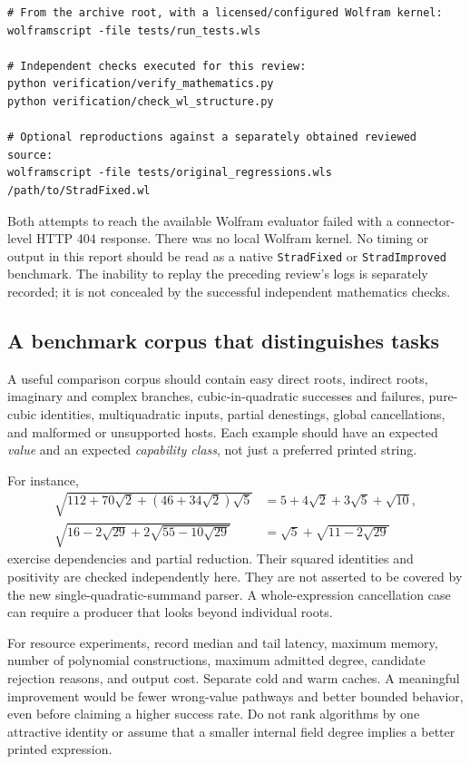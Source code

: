 \documentclass[11pt,letterpaper]{article}
\newcommand{\code}[1]{\texttt{#1}}
\theoremstyle{definition}
\begin{document}
\begin{lstlisting}
# From the archive root, with a licensed/configured Wolfram kernel:
wolframscript -file tests/run_tests.wls

# Independent checks executed for this review:
python verification/verify_mathematics.py
python verification/check_wl_structure.py

# Optional reproductions against a separately obtained reviewed source:
wolframscript -file tests/original_regressions.wls /path/to/StradFixed.wl
\end{lstlisting}

Both attempts to reach the available Wolfram evaluator failed with a connector-level HTTP 404 response. There was no local Wolfram kernel. No timing or output in this report should be read as a native \code{StradFixed} or \code{StradImproved} benchmark. The inability to replay the preceding review's logs is separately recorded; it is not concealed by the successful independent mathematics checks.

\subsection{A benchmark corpus that distinguishes tasks}

A useful comparison corpus should contain easy direct roots, indirect roots, imaginary and complex branches, cubic-in-quadratic successes and failures, pure-cubic identities, multiquadratic inputs, partial denestings, global cancellations, and malformed or unsupported hosts. Each example should have an expected \emph{value} and an expected \emph{capability class}, not just a preferred printed string.

For instance,
\begin{align*}
 \sqrt{112+70\sqrt2+(46+34\sqrt2)\sqrt5}
 &=5+4\sqrt2+3\sqrt5+\sqrt{10},\\
 \sqrt{16-2\sqrt{29}+2\sqrt{55-10\sqrt{29}}}
 &=\sqrt5+\sqrt{11-2\sqrt{29}}
\end{align*}
exercise dependencies and partial reduction. Their squared identities and positivity are checked independently here. They are not asserted to be covered by the new single-quadratic-summand parser. A whole-expression cancellation case can require a producer that looks beyond individual roots.

For resource experiments, record median and tail latency, maximum memory, number of polynomial constructions, maximum admitted degree, candidate rejection reasons, and output cost. Separate cold and warm caches. A meaningful improvement would be fewer wrong-value pathways and better bounded behavior, even before claiming a higher success rate. Do not rank algorithms by one attractive identity or assume that a smaller internal field degree implies a better printed expression.
\end{document}
